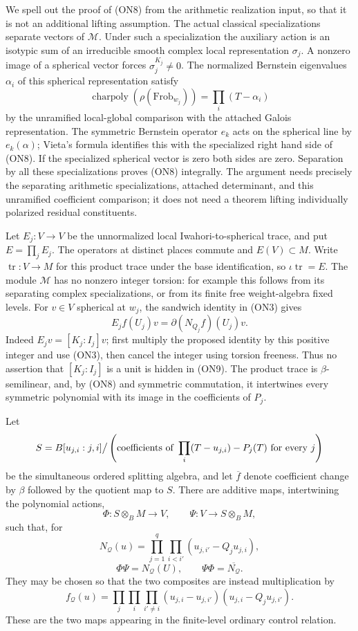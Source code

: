 We spell out the proof of (ON8) from the arithmetic realization
input, so that it is not an additional lifting assumption.
The actual classical specializations separate vectors of
\(\mathcal M\).  Under such a specialization the auxiliary action
is an isotypic sum of an irreducible smooth complex local
representation \(\sigma_j\).  A nonzero image of a spherical vector
forces \(\sigma_j^{K_j}\ne0\).
The normalized Bernstein eigenvalues \(\alpha_i\) of this spherical
representation satisfy
\[
 \operatorname{charpoly}(\rho(\mathrm{Frob}_{w_j}))
       =\prod_i(T-\alpha_i)
\]
by the unramified local-global comparison with the attached Galois
representation.  The symmetric Bernstein operator \(e_k\) acts on
the spherical line by \(e_k(\alpha)\); Vieta's formula identifies
this with the specialized right hand side of (ON8).
If the specialized spherical vector is zero both sides are zero.
Separation by all these specializations proves (ON8) integrally.
The argument needs precisely the separating arithmetic
specializations, attached determinant, and this unramified
coefficient comparison; it does not need a theorem lifting
individually polarized residual constituents.

Let \(E_j:V\to V\) be the unnormalized local Iwahori-to-spherical
trace, and put \(E=\prod_jE_j\).
The operators at distinct places commute and \(E(V)\subset M\).
Write \(\operatorname{tr}:V\to M\) for this product trace under the
base identification, so \(\iota\operatorname{tr}=E\).
The module \(\mathcal M\) has no nonzero integer torsion: for example
this follows from its separating complex specializations, or from
its finite free weight-algebra fixed levels.
For \(v\in V\) spherical at \(w_j\), the sandwich identity in (ON3)
gives
\[
 E_j f(U_j)v=\partial(N_{Q_j}f)(U_j)v.
 \tag{ON9}
\]
Indeed \(E_jv=[K_j:I_j]v\); first multiply the proposed identity by
this positive integer and use (ON3), then cancel the integer using
torsion freeness.  Thus no assertion that \([K_j:I_j]\) is a unit
is hidden in (ON9).
The product trace is \(\beta\)-semilinear, and, by (ON8) and
symmetric commutation, it intertwines every symmetric polynomial
with its image in the coefficients of \(P_j\).

\begin{srproposition}
\label{prop:concrete-two-maps}
Let
\[
 S=B[u_{j,i}:j,i]\big/
 \left(\hbox{coefficients of }
          \prod_i(T-u_{j,i})-P_j(T)\ \hbox{for every }j\right)
\]
be the simultaneous ordered splitting algebra, and let
\(\overline f\) denote coefficient change by \(\beta\) followed by
the quotient map to \(S\).
There are additive maps, intertwining the polynomial actions,
\[
 \Phi:S\otimes_BM\longrightarrow V,\qquad
 \Psi:V\longrightarrow S\otimes_BM,
\]
such that, for
\[
 N_{\mathcal Q}(u)=
     \prod_{j=1}^q\prod_{i<i'}(u_{j,i'}-Q_ju_{j,i}),
\]
\[
 \Phi\Psi=N_{\mathcal Q}(U),\qquad
 \Psi\Phi=\overline{N_{\mathcal Q}}.
 \tag{ON10}
\]
They may be chosen so that the two composites are instead
multiplication by
\[
 f_{\mathcal Q}(u)=
 \prod_j\prod_i\prod_{i'\ne i}
       (u_{j,i}-u_{j,i'})(u_{j,i}-Q_ju_{j,i'}).
 \tag{ON11}
\]
These are the two maps appearing in the finite-level ordinary
control relation.
\end{srproposition}

